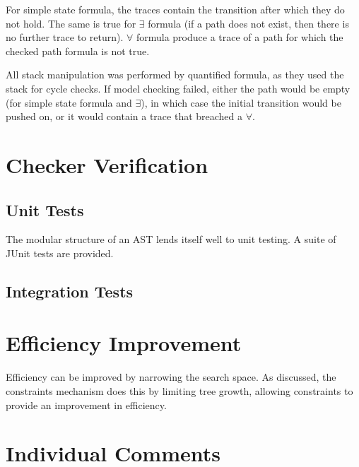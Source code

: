 \documentclass[a4paper,11pt]{article}
\begin{document}
	For simple state formula, the traces contain the transition after which they do not hold. The same is true for $\exists$ formula (if a path does not exist, then there is no further trace to return). $\forall$ formula produce a trace of a path for which the checked path formula is not true. 
	
	All stack manipulation was performed by quantified formula, as they used the stack for cycle checks. If model checking failed, either the path would be empty (for simple state formula and $\exists$), in which case the initial transition would be pushed on, or it would contain a trace that breached a $\forall$.
	
	\section{Checker Verification}
	\subsection{Unit Tests}
	The modular structure of an AST lends itself well to unit testing. A suite of JUnit tests are provided.
	
	\subsection{Integration Tests}
	
	\section{Efficiency Improvement}
	Efficiency can be improved by narrowing the search space. As discussed, the constraints mechanism does this by limiting tree growth, allowing constraints to provide an improvement in efficiency.
	
	\section{Individual Comments}
	
		
		
		
		
		
\end{document}
